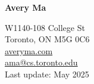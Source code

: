 \documentclass[11pt,letterpaper]{article}
\begin{document}
\begin{minipage}[t]{0.55\textwidth}
    \vspace{10pt}
    {\bfseries\fontsize{30}{44}\selectfont Avery Ma}
\end{minipage}
\begin{minipage}[t]{0.45\textwidth}
    \raggedleft
    \small
    W1140-108 College St\\
    Toronto, ON M5G 0C6 \\
    \href{http://averyma.com}{averyma.com} \\
    \href{mailto:ama@cs.toronto.edu}{ama@cs.toronto.edu} \\
    Last update: May 2025
\end{minipage}




% 

% 
\end{document}
